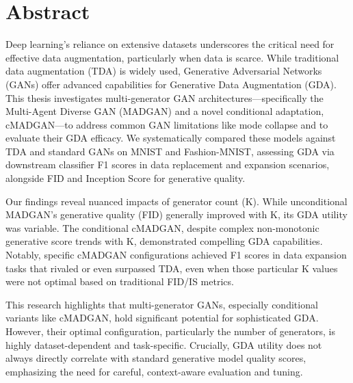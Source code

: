 

\section*{Abstract}
\pagestyle{empty}
Deep learning's reliance on extensive datasets underscores the critical need for effective data augmentation, particularly when data is scarce. While traditional data augmentation (TDA) is widely used, Generative Adversarial Networks (GANs) offer advanced capabilities for Generative Data Augmentation (GDA). This thesis investigates multi-generator GAN architectures—specifically the Multi-Agent Diverse GAN (MADGAN) and a novel conditional adaptation, cMADGAN—to address common GAN limitations like mode collapse and to evaluate their GDA efficacy. We systematically compared these models against TDA and standard GANs on MNIST and Fashion-MNIST, assessing GDA via downstream classifier F1 scores in data replacement and expansion scenarios, alongside FID and Inception Score for generative quality.

Our findings reveal nuanced impacts of generator count (K). While unconditional MADGAN's generative quality (FID) generally improved with K, its GDA utility was variable. The conditional cMADGAN, despite complex non-monotonic generative score trends with K, demonstrated compelling GDA capabilities. Notably, specific cMADGAN configurations achieved F1 scores in data expansion tasks that rivaled or even surpassed TDA, even when those particular K values were not optimal based on traditional FID/IS metrics.

This research highlights that multi-generator GANs, especially conditional variants like cMADGAN, hold significant potential for sophisticated GDA. However, their optimal configuration, particularly the number of generators, is highly dataset-dependent and task-specific. Crucially, GDA utility does not always directly correlate with standard generative model quality scores, emphasizing the need for careful, context-aware evaluation and tuning.

